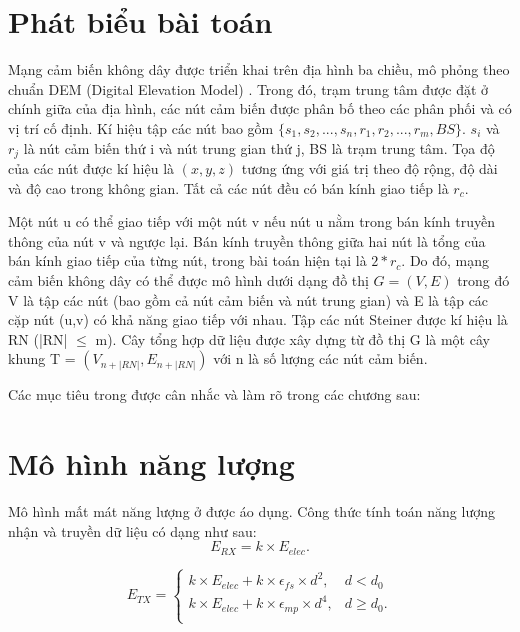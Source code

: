 \section{Phát biểu bài toán}
Mạng cảm biến không dây được triển khai trên địa hình ba chiều, mô phỏng theo chuẩn DEM (Digital Elevation Model) \cite{mukherjee2013evaluation}. Trong đó, trạm trung tâm được đặt ở chính giữa của địa hình, các nút cảm biến được phân bố theo các phân phối và có vị trí cố định. Kí hiệu tập các nút bao gồm $\{s_{1},s_{2},...,s_{n},r_{1},r_{2},...,r_{m},BS\}$. $s_{i}$ và $r_{j}$ là nút cảm biến thứ i và nút trung gian thứ j, BS là trạm trung tâm. Tọa độ của các nút được kí hiệu là $(x,y,z)$ tương ứng với giá trị theo độ rộng, độ dài và độ cao trong không gian. Tất cả các nút đều có bán kính giao tiếp là $r_{c}$.


Một nút u có thể giao tiếp với một nút v nếu nút u nằm trong bán kính truyền thông của nút v và ngược lại. Bán kính truyền thông giữa hai nút là tổng của bán kính giao tiếp của từng nút, trong bài toán hiện tại là $2*r_{c}$. Do đó, mạng cảm biến không dây có thể được mô hình dưới dạng đồ thị $G = (V,E)$ trong đó V là tập các nút (bao gồm cả nút cảm biến và nút trung gian) và E là tập các cặp nút (u,v) có khả năng giao tiếp với nhau. Tập các nút Steiner được kí hiệu là RN (|RN| $\leq$ m). Cây tổng hợp dữ liệu được xây dựng từ đồ thị G là một cây khung T = $(V_{n+|RN|},E_{n+|RN|})$ với n là số lượng các nút cảm biến.


Các mục tiêu trong \cite{lu2014construction} được cân nhắc và làm rõ trong các chương sau: 

\section{Mô hình năng lượng}
Mô hình mất mát năng lượng ở \cite{heinzelman2002application} được áo dụng. Công thức tính toán năng lượng nhận và truyền dữ liệu có dạng như sau:
\begin{equation}
E_{RX} = k \times E_{elec}.
\end{equation}

\begin{equation}
E_{TX} = 
\begin{cases}
k \times E_{elec} + k \times \epsilon_{fs} \times d^2,  & d < d_0\\
k \times E_{elec} + k \times \epsilon_{mp} \times d^4, & d \geq d_0.\\
\end{cases}
\end{equation}

